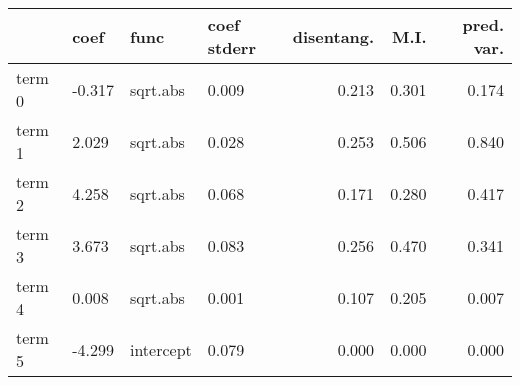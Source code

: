 \documentclass{article}%
\begin{document}
\begin{table}[H]%
\centering%
\footnotesize%
\begin{tabular}{llllrrr}
\toprule
{} &    coef &       func & coef stderr &  disentang. &   M.I. &  pred. var. \\
\midrule
term 0 &  -0.317 &   sqrt.abs &       0.009 &       0.213 &  0.301 &       0.174 \\
term 1 &   2.029 &   sqrt.abs &       0.028 &       0.253 &  0.506 &       0.840 \\
term 2 &   4.258 &   sqrt.abs &       0.068 &       0.171 &  0.280 &       0.417 \\
term 3 &   3.673 &   sqrt.abs &       0.083 &       0.256 &  0.470 &       0.341 \\
term 4 &   0.008 &   sqrt.abs &       0.001 &       0.107 &  0.205 &       0.007 \\
term 5 &  -4.299 &  intercept &       0.079 &       0.000 &  0.000 &       0.000 \\
\bottomrule
\end{tabular}
%
\end{table}

%
\vfill \pagebreak

%
\end{document}
